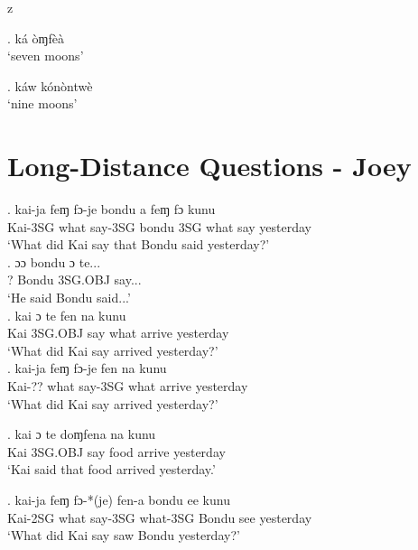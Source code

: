 z   \documentclass{assets/fieldnotes}
\begin{document}
\ex. ká òɱfèà \\
`seven moons'

\ex. káw kónòntwè \\ 
`nine moons' 






\section{Long-Distance Questions - Joey}

\exg. kai-ja feɱ fɔ-je bondu a feɱ fɔ kunu\\
Kai-3SG what say-3SG bondu 3SG what say yesterday\\
`What did Kai say that Bondu said yesterday?'\\ 

\exg. ɔɔ bondu ɔ te... \\
? Bondu 3SG.OBJ say...\\
`He said Bondu said...'\\ 

\exg. kai ɔ te fen na kunu\\
Kai 3SG.OBJ say what arrive yesterday\\
`What did Kai say arrived yesterday?'\\ 

\exg. kai-ja feɱ fɔ-je fen na kunu\\
Kai-?? what say-3SG what arrive yesterday\\
`What did Kai say arrived yesterday?'\\ 


\exg. kai ɔ te doɱfena na kunu\\
Kai 3SG.OBJ say food arrive yesterday\\
`Kai said that food arrived yesterday.'\\ 


\exg. kai-ja feɱ fɔ-*(je) fen-a bondu ee kunu   \\
Kai-2SG what say-3SG what-3SG Bondu see yesterday\\
`What did Kai say saw Bondu yesterday?'\\ 

\end{document}
